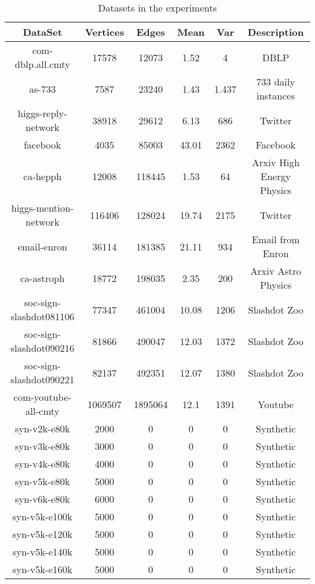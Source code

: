 \documentclass{sig-alternate-2013}
\begin{document}
\begin{table*}[!hpp]
\centering
\caption{Datasets in the experiments}
\begin{tabular}{cccccc}
\hline
DataSet                 & Vertices  & Edges   &Mean    &Var     & Description\\
\hline
com-dblp.all.cmty       & 17578     & 12073   &1.52     &4      & DBLP\\
as-733                  & 7587      & 23240   &1.43     &1.437  & 733 daily instances\\
higgs-reply-network     & 38918     & 29612   &6.13     &686    & Twitter\\
facebook                & 4035      & 85003   &43.01    &2362   & Facebook \\
ca-hepph                & 12008     & 118445  &1.53     &64     & Arxiv High Energy Physics\\
higgs-mention-network   & 116406    & 128024  &19.74    &2175   & Twitter\\
email-enron             & 36114     & 181385  &21.11    &934    & Email from Enron\\
ca-astroph              & 18772     & 198035  &2.35     &200    & Arxiv Astro Physics\\
soc-sign-slashdot081106 & 77347     & 461004  &10.08    &1206   & Slashdot Zoo \\
soc-sign-slashdot090216 & 81866     & 490047  &12.03    &1372   & Slashdot Zoo\\
soc-sign-slashdot090221 & 82137     & 492351  &12.07    &1380   & Slashdot Zoo\\
com-youtube-all-cmty    & 1069507   & 1895064 &12.1     &1391   & Youtube\\
\hline
syn-v2k-e80k            & 2000      & 0       &0     &0   & Synthetic\\
syn-v3k-e80k            & 3000      & 0       &0     &0   & Synthetic\\
syn-v4k-e80k            & 4000      & 0       &0     &0   & Synthetic\\
syn-v5k-e80k            & 5000      & 0       &0     &0   & Synthetic\\
syn-v6k-e80k            & 6000      & 0       &0     &0   & Synthetic\\
syn-v5k-e100k           & 5000      & 0       &0     &0   & Synthetic\\
syn-v5k-e120k           & 5000      & 0       &0     &0   & Synthetic\\
syn-v5k-e140k           & 5000      & 0       &0     &0   & Synthetic\\
syn-v5k-e160k           & 5000      & 0       &0     &0   & Synthetic\\
\hline
\end{tabular}
\end{table*}
\end{document}
